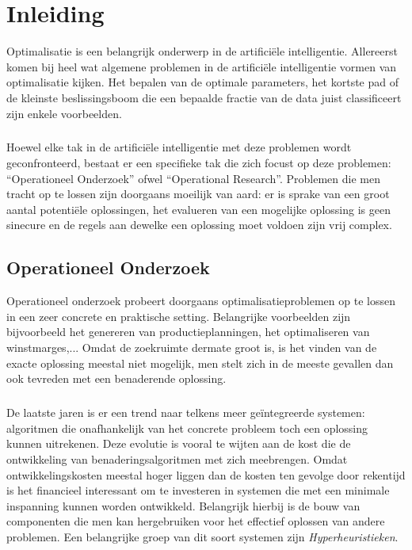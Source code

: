 \chapter{Inleiding}

Optimalisatie is een belangrijk onderwerp in de artifici\"ele intelligentie. Allereerst komen bij heel wat algemene problemen in de artifici\"ele intelligentie vormen van optimalisatie kijken. Het bepalen van de optimale parameters, het kortste pad of de kleinste beslissingsboom die een bepaalde fractie van de data juist classificeert zijn enkele voorbeelden.

\paragraph{}
Hoewel elke tak in de artifici\"ele intelligentie met deze problemen wordt geconfronteerd, bestaat er een specifieke tak die zich focust op deze problemen: ``Operationeel Onderzoek'' ofwel ``Operational Research''. Problemen die men tracht op te lossen zijn doorgaans moeilijk van aard: er is sprake van een groot aantal potenti\"ele oplossingen, het evalueren van een mogelijke oplossing is geen sinecure en de regels aan dewelke een oplossing moet voldoen zijn vrij complex.

\section{Operationeel Onderzoek}

Operationeel onderzoek probeert doorgaans optimalisatieproblemen op te lossen in een zeer concrete en praktische setting. Belangrijke voorbeelden zijn bijvoorbeeld het genereren van productieplanningen, het optimaliseren van winstmarges,... Omdat de zoekruimte dermate groot is, is het vinden van de exacte oplossing meestal niet mogelijk, men stelt zich in de meeste gevallen dan ook tevreden met een benaderende oplossing.

\paragraph{}
De laatste jaren is er een trend naar telkens meer ge\"integreerde systemen: algoritmen die onafhankelijk van het concrete probleem toch een oplossing kunnen uitrekenen. Deze evolutie is vooral te wijten aan de kost die de ontwikkeling van benaderingsalgoritmen met zich meebrengen. Omdat ontwikkelingskosten meestal hoger liggen dan de kosten ten gevolge door rekentijd is het financieel interessant om te investeren in systemen die met een minimale inspanning kunnen worden ontwikkeld. Belangrijk hierbij is de bouw van componenten die men kan hergebruiken voor het effectief oplossen van andere problemen. Een belangrijke groep van dit soort systemen zijn \emph{Hyperheuristieken}.

